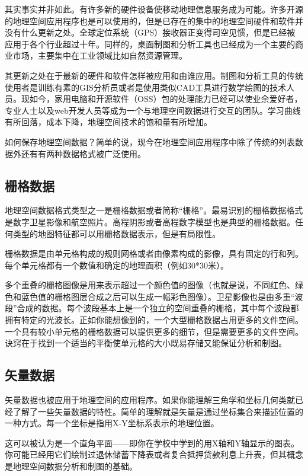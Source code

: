 其实事实并非如此。有许多新的硬件设备使移动地理信息服务成为可能。许多开源的地理空间应用程序也是可以使用的，但是已存在的集中的地理空间硬件和软件并没有什么更新之处。全球定位系统（GPS）接收器正变得司空见惯，但是已经被应用于各个行业超过十年。同样的，桌面制图和分析工具也已经成为一个主要的商业市场，主要集中在工业领域比如自然资源管理。
        
其更新之处在于最新的硬件和软件怎样被应用和由谁应用。制图和分析工具的传统使用者是训练有素的GIS分析员或者是使用类似CAD工具进行数学绘图的技术人员。现如今，家用电脑和开源软件（OSS）包的处理能力已经可以使业余爱好者，专业人士以及web开发人员等成为一个与地理空间数据进行交互的团队。学习曲线有所回落，成本下降，地理空间技术的饱和量有所增加。
        
如何保存地理空间数据？简单的说，现今在地理空间应用程序中除了传统的列表数据外还有有两种数据格式被广泛使用。

\subsection{栅格数据}\label{label_rasterdata}

地理空间数据格式类型之一是栅格数据或者简称“栅格”。最易识别的栅格数据格式是数字卫星影像和航空照片。高程阴影或者高程数字模型也是典型的栅格数据。任何类型的地图特征都可以用栅格数据表示，但是有局限性。
        
栅格数据是由单元格构成的规则网格或者由像素构成的影像，具有固定的行和列。每个单元格都有一个数值和确定的地理面积（例如30*30米）。

多个重叠的栅格图像是用来表示超过一个颜色值的图像（也就是说，不同红色、绿色和蓝色值的栅格图层合成之后可以生成一幅彩色图像）。卫星影像也是由多重“波段”合成的数据。每个波段基本上是一个独立的空间重叠的栅格，其中每个波段都拥有特定的光波长。正如你能想像到的，一个大型栅格数据占用更多的文件空间。一个具有较小单元格的栅格数据可以提供更多的细节，但是需要更多的文件空间。诀窍在于找到一个适当的平衡使单元格的大小既易存储又能保证分析和制图。

\subsection{矢量数据}\label{label_vectordata}

矢量数据也被应用于地理空间的应用程序。如果你能理解三角学和坐标几何类就已经了解了一些矢量数据的特性。简单的理解就是矢量是通过坐标集合来描述位置的一种方式。每一个坐标是指用X-Y坐标系表示的地理位置。
        
这可以被认为是一个直角平面——即你在学校中学到的用X轴和Y轴显示的图表。你可能已经用它们绘制过退休储蓄下降表或者复合抵押贷款利息上升表，但其概念是地理空间数据分析和制图的基础。
        
